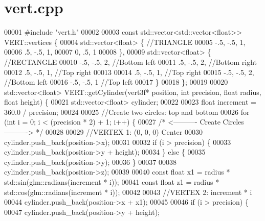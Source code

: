\section{vert.\+cpp}
\label{vert_8cpp_source}

\begin{DoxyCode}
00001 \textcolor{preprocessor}{#include "vert.h"}
00002 
00003 \textcolor{keyword}{const} std::vector<std::vector<float>> VERT::vertices \{
00004     std::vector<float> \{ \textcolor{comment}{//TRIANGLE}
00005         -.5, -.5, 1,
00006          .5, -.5, 1,
00007           0,  .5, 1
00008     \},
00009     std::vector<float> \{ \textcolor{comment}{//RECTANGLE}
00010         -.5, -.5, 2,     \textcolor{comment}{//Bottom left}
00011          .5, -.5, 2,     \textcolor{comment}{//Bottom right}
00012          .5, -.5, 1,     \textcolor{comment}{//Top right}
00013 
00014          .5, -.5, 1,     \textcolor{comment}{//Top right}
00015         -.5, -.5, 2,     \textcolor{comment}{//Bottom left}
00016         -.5, -.5, 1      \textcolor{comment}{//Top left}
00017     \}
00018 \};
00019 
00020 std::vector<float> VERT::getCylinder(vert3f* position, \textcolor{keywordtype}{int} precision, \textcolor{keywordtype}{float} radius, \textcolor{keywordtype}{float} height) \{
00021     std::vector<float> cylinder;
00022 
00023     \textcolor{keywordtype}{float} increment = 360.0 / precision;
00024 
00025     \textcolor{comment}{//Create two circles: top and bottom}
00026     \textcolor{keywordflow}{for} (\textcolor{keywordtype}{int} i = 0; i < (precision * 2) + 1; i++) \{
00027         \textcolor{comment}{/* <---------- Create Circles ----------> */}
00028 
00029         \textcolor{comment}{//VERTEX 1: (0, 0, 0) Center}
00030         cylinder.push\_back(position->x);
00031 
00032         \textcolor{keywordflow}{if} (i > precision) \{
00033             cylinder.push\_back(position->y + height);
00034         \} \textcolor{keywordflow}{else} \{
00035             cylinder.push\_back(position->y);
00036         \}
00037 
00038         cylinder.push\_back(position->z);
00039 
00040         \textcolor{keyword}{const} \textcolor{keywordtype}{float} x1 = radius * std::sin(glm::radians(increment * i));
00041         \textcolor{keyword}{const} \textcolor{keywordtype}{float} z1 = radius * std::cos(glm::radians(increment * i));
00042 
00043         \textcolor{comment}{//VERTEX 2: increment * i}
00044         cylinder.push\_back(position->x + x1);
00045         
00046         \textcolor{keywordflow}{if} (i > precision) \{
00047             cylinder.push\_back(position->y + height);

\end{DoxyCode}
